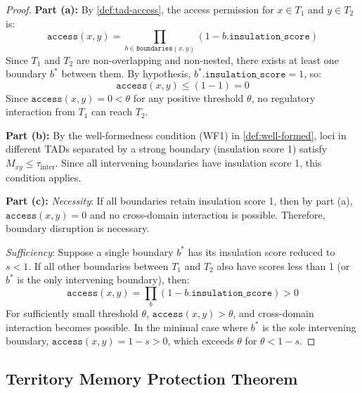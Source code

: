 \documentclass[12pt,a4paper]{article}
\theoremstyle{plain}
\theoremstyle{definition}
\begin{document}
\begin{proof}
\textbf{Part (a):} By \cref{def:tad-access}, the access permission for $x \in T_1$ and $y \in T_2$ is:
\[
  \texttt{access}(x, y) = \prod_{b \in \texttt{Boundaries}(x,y)} (1 - b.\texttt{insulation\_score})
\]
Since $T_1$ and $T_2$ are non-overlapping and non-nested, there exists at least one boundary $b^*$ between them. By hypothesis, $b^*.\texttt{insulation\_score} = 1$, so:
\[
  \texttt{access}(x, y) \leq (1 - 1) = 0
\]
Since $\texttt{access}(x,y) = 0 < \theta$ for any positive threshold $\theta$, no regulatory interaction from $T_1$ can reach $T_2$.

\textbf{Part (b):} By the well-formedness condition (WF1) in \cref{def:well-formed}, loci in different TADs separated by a strong boundary (insulation score 1) satisfy $M_{xy} \leq \tau_{\text{inter}}$. Since all intervening boundaries have insulation score 1, this condition applies.

\textbf{Part (c):} \emph{Necessity}: If all boundaries retain insulation score 1, then by part (a), $\texttt{access}(x,y) = 0$ and no cross-domain interaction is possible. Therefore, boundary disruption is necessary.

\emph{Sufficiency}: Suppose a single boundary $b^*$ has its insulation score reduced to $s < 1$. If all other boundaries between $T_1$ and $T_2$ also have scores less than 1 (or $b^*$ is the only intervening boundary), then:
\[
  \texttt{access}(x, y) = \prod_{b} (1 - b.\texttt{insulation\_score}) > 0
\]
For sufficiently small threshold $\theta$, $\texttt{access}(x,y) > \theta$, and cross-domain interaction becomes possible. In the minimal case where $b^*$ is the sole intervening boundary, $\texttt{access}(x,y) = 1 - s > 0$, which exceeds $\theta$ for $\theta < 1 - s$.
\end{proof}

\subsection{Territory Memory Protection Theorem}
\end{document}
